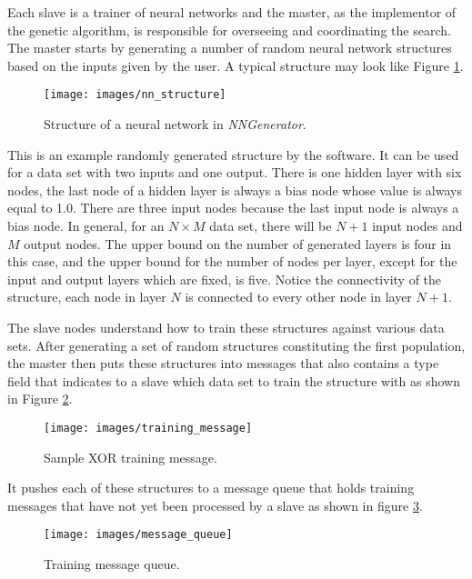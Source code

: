 Each slave is a trainer of neural networks and the master, as the implementor of the genetic algorithm, is responsible for overseeing and coordinating the search.
The master starts by generating a number of random neural network structures based on the inputs given by the user.
A typical structure may look like Figure \ref{nn_structure}.

\begin{figure}[htb!]
  \centering
  \texttt{[image: images/nn\_structure]}
  \caption{Structure of a neural network in {\it NNGenerator}.}
  \label{nn_structure}
\end{figure}

This is an example randomly generated structure by the software.
It can be used for a data set with two inputs and one output.
There is one hidden layer with six nodes, the last node of a hidden layer is always a bias node whose value is always equal to 1.0.
There are three input nodes because the last input node is always a bias node.
In general, for an $N \times M$ data set, there will be $N + 1$ input nodes and $M$ output nodes.
The upper bound on the number of generated layers is four in this case, and the upper bound for the number of nodes per layer, except for the input and output layers which are fixed, is five.
Notice the connectivity of the structure, each node in layer $N$ is connected to every other node in layer $N+1$.  

The slave nodes understand how to train these structures against various data sets.
After generating a set of random structures constituting the first
population, the master then puts these structures into messages that
also contains a type field that indicates to a slave which data set to
train the structure with as shown in Figure \ref{training_message}.

\begin{figure}[htb!]
  \centering
  \texttt{[image: images/training\_message]}
  \caption{Sample XOR training message.}
  \label{training_message}
\end{figure}

It pushes each of these structures to a message queue that holds training messages that have not yet been processed by a slave as shown in figure \ref{message_queue}.

\begin{figure}[htb!]
  \centering
  \texttt{[image: images/message\_queue]}
  \caption{Training message queue.}
  \label{message_queue}
\end{figure}

